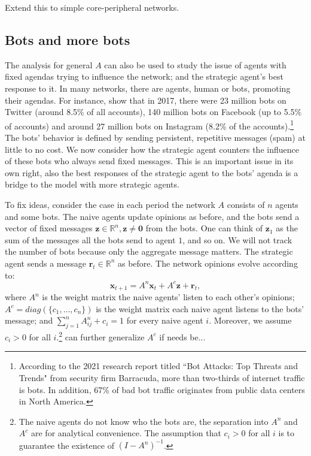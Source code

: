 \documentclass{article}
\newcommand{\x}{\mathbf{x}}
\newcommand{\re}{\mathbf{r}}
\newcommand{\z}{\mathbf{z}}
\newcommand{\wl}[1]{{\color{blue} #1}}
\begin{document}
Extend this to simple core-peripheral networks.

\subsection*{Bots and more bots}

The analysis for general $A$ can also be used to study the issue of agents with fixed agendas trying to influence the network; and the strategic agent's best response to it. 
In many networks, there are agents, human or bots, promoting their agendas. For instance, \cite{Vosoughi2018} show that in 2017, there were 23 million bots on Twitter (around 8.5\% of all accounts), 140 million bots on Facebook (up to 5.5\% of accounts) and around 27 million bots on Instagram (8.2\% of the accounts).\footnote{According to the 2021 research report titled ``Bot Attacks: Top Threats and Trends" from security firm Barracuda, more than two-thirds of internet traffic is bots. In addition, 67\% of bad bot traffic originates from public data centers in North America.} The bots' behavior is defined by sending persistent, repetitive messages (spam) at little to no cost. 
We now consider how the strategic agent counters the influence of these bots who always send fixed messages. This is an important issue in its own right, also the best responses of the strategic agent to the bots' agenda is a bridge to the model with more strategic agents. 

To fix ideas, consider the case in each period the network $A$ consists of $n$ agents and some bots. The naive agents update opinions as before, and the bots send a vector of fixed messages  $\z \in \mathbb R^n, \z \neq \mathbf 0$ from the bots. One can think of $\z_1$ as the sum of the messages all the bots send to agent $1$, and so on. We will not track the number of bots because only the aggregate message matters. The strategic agent sends a message $\re_t \in \mathbb R^n$ as before. The network opinions evolve according to: $$\x_{t+1}=A^n\x_t+ A^c\z+\re_t,$$ where $A^n$ is the weight matrix the naive agents' listen to each other's opinions; $A^c=diag(\{c_1,\ldots,c_n\})$ is the weight matrix each naive agent listens to the bots' message; and $\sum_{j=1}^n A^n_{ij}+c_i=1$ for every naive agent $i$. Moreover, we assume $c_i>0$ for all $i$.\footnote{The naive agents do not know who the bots are, the separation into $A^n$ and $A^c$ are for analytical convenience. The assumption that $c_i>0$ for all $i$ is to guarantee the existence of $(I-A^n)^{-1}$.} \wl{can further generalize $A^c$ if needs be...} 
\end{document}
